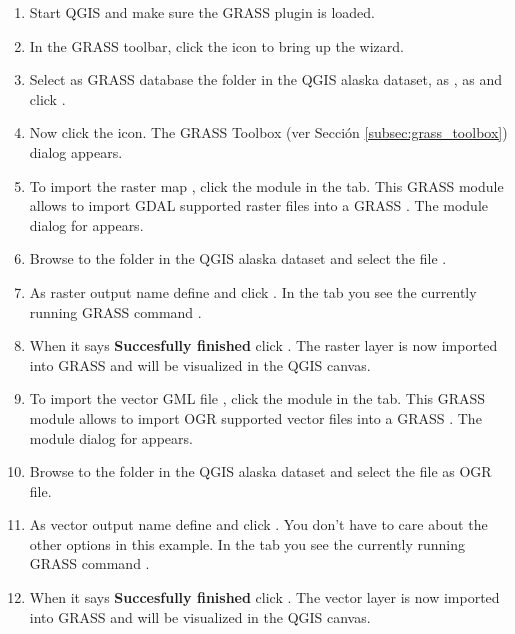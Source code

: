 \begin{enumerate}
  \item Start QGIS and make sure the GRASS plugin is loaded.
  \item In the GRASS toolbar, click the  icon to bring up the  wizard.
  \item Select as GRASS database the folder  in the QGIS 
  alaska dataset, as , as  
   and click .
  \item Now click the  icon. The 
  GRASS Toolbox (ver Sección \ref{subsec:grass_toolbox}) dialog appears.
  \item To import the raster map , click the module 
   in the  tab. This GRASS module 
  allows to import GDAL supported raster files into a GRASS 
  . The module dialog for  appears.
  \item Browse to the folder  in the QGIS alaska dataset 
  and select the file .
  \item As raster output name define  and click 
  . In the  tab you see the currently running GRASS 
  command .
  \item When it says \textbf{Succesfully finished} click . 
  The  raster layer is now imported into GRASS and 
  will be visualized in the QGIS canvas.
  \item To import the vector GML file , click the module 
   in the  tab. This GRASS module allows 
  to import OGR supported vector files into a GRASS . The 
  module dialog for  appears.
  \item Browse to the folder  in the QGIS alaska 
  dataset and select the file  as OGR file.
  \item As vector output name define  and click 
  . You don't have to care about the other options in this 
  example. In the  tab you see the currently running GRASS 
  command .
  \item When it says \textbf{Succesfully finished} click . 
  The  vector layer is now imported into GRASS and will 
  be visualized in the QGIS canvas. 
\end{enumerate}


